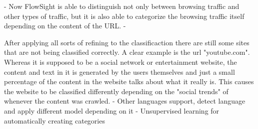 - Now FlowSight is able to distinguish not only between browsing traffic and other types of traffic, but it is also able to categorize the browsing traffic itself depending on the content of the URL.
- 


After applying all sorts of refining to the classificaction there are still some sites that are not being classified correctly. A clear example is the url "youtube.com". Whereas it is supposed to be
a social network or entertainment website, the content and text in it is generated by the users themselves and just a small percentage of the content in the website talks about what it really is.
This causes the website to be classified differently depending on the "social trends" of whenever the content was crawled.
- Other languages support, detect language and apply different model depending on it
- Unsupervised learning for automatically creating categories

